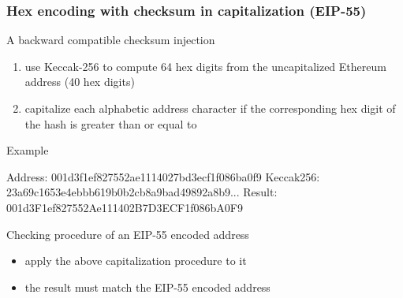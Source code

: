 \documentclass[11pt]{beamer}  %
\def\codesize{\smaller}
\def\<#1>{\codeid{#1}}
\newcommand{\codeid}[1]{\ifmmode{\mbox{\codesize\ttfamily{#1}}}\else{\codesize\ttfamily #1}\fi}
\begin{document}
\begin{frame}[fragile]\frametitle{Hex encoding with checksum in capitalization (EIP-55)}

  \begin{greenbox}{A backward compatible checksum injection}
    \begin{enumerate}
    \item use Keccak-256 to compute 64 hex digits from the uncapitalized Ethereum address
      (40 hex digits)
    \item capitalize each alphabetic address character if the corresponding hex digit
      of the hash is greater than or equal to \<0x8>
    \end{enumerate}
  \end{greenbox}

  \bigskip

  \begin{greenbox}{Example}
\begin{semiverbatim}
Address:   001d3f1ef827552ae1114027bd3ecf1f086ba0f9
Keccak256: 23a69c1653e4ebbb619b0b2cb8a9bad49892a8b9...
Result:    001d3{\color{red}F}1ef827552{\color{red}A}e111402{\color{red}B}7{\color{red}D}3{\color{red}ECF}1f086b{\color{red}A}0{\color{red}F}9
\end{semiverbatim}
  \end{greenbox}

  \bigskip

  \begin{greenbox}{Checking procedure of an EIP-55 encoded address}
    \begin{itemize}
    \item apply the above capitalization procedure to it
    \item the result must match the EIP-55 encoded address
    \end{itemize}
  \end{greenbox}

\end{frame}
\end{document}
